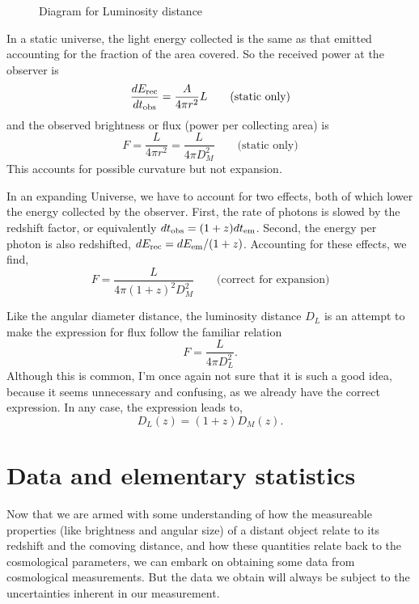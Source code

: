 \begin{figure}
  \caption{Diagram for Luminosity distance}
\end{figure}

In a static universe, the light energy collected is the same as that emitted accounting for the fraction of the area covered. So the received power at the observer is
\begin{equation}
  \frac{dE_{\rm rec}}{dt_{\rm obs}} = \frac{A}{4\pi r^2}L   \qquad \mbox{(static only)}
\end{equation}
and the observed brightness or flux (power per collecting area) is
\begin{equation}
  F = \frac{L}{4\pi r^2} =  \frac{L}{4\pi D_M^2}  \qquad \mbox{(static only)}
\end{equation}
This accounts for possible curvature but not expansion.

In an expanding Universe, we have to account for two effects, both of which lower the energy collected by the observer.  First, the rate of photons is slowed by the redshift factor, or equivalently $dt_{\rm obs} = (1+z) dt_{\rm em}$.  Second, the energy per photon is also redshifted, $dE_{\rm rec} = dE_{\rm em}/(1+z)$.  Accounting for these effects, we find,
\begin{equation}
    F = \frac{L}{4\pi (1+z)^2 D_M^2}  \qquad \mbox{(correct for expansion)}
\end{equation}

Like the angular diameter distance, the luminosity distance $D_L$ is an attempt to make the expression for flux follow the familiar relation
\begin{equation}
    F = \frac{L}{4\pi D_L^2}.
\end{equation}
Although this is common, I'm once again not sure that it is such a good idea, because it seems unnecessary and confusing, as we already have the correct expression.  In any case, the expression leads to,
\begin{equation}
  D_L(z) = (1+z) D_M(z).
\end{equation}

\section{Data and elementary statistics}
Now that we are armed with some understanding of how the measureable properties (like brightness and angular size) of a distant object relate to its redshift and the comoving distance, and how these quantities relate back to the cosmological parameters, we can embark on obtaining some data from cosmological measurements.  But the data we obtain will always be subject to the uncertainties inherent in our measurement.

